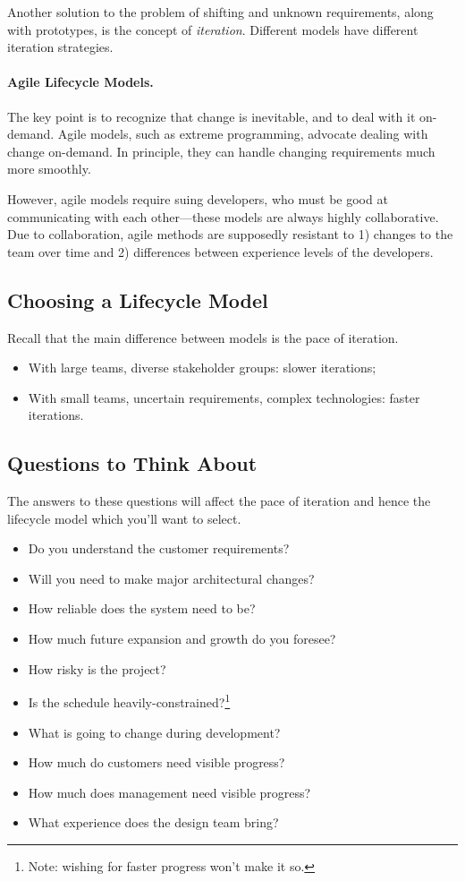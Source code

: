 Another solution to the problem of shifting and unknown requirements,
along with prototypes, is the concept of \emph{iteration}. Different
models have different iteration strategies.

\paragraph{Agile Lifecycle Models.} The key point is to recognize
that change is inevitable, and to deal with it on-demand. Agile
models, such as extreme programming, advocate dealing with change
on-demand. In principle, they can handle changing requirements much
more smoothly.

However, agile models require suing developers, who must be good at
communicating with each other---these models are always highly
collaborative. Due to collaboration, agile methods are
supposedly resistant to 1) changes to the team over time and
2) differences between experience levels of the developers.

\subsection*{Choosing a Lifecycle Model}
Recall that the main difference between models is the pace of iteration.
\begin{itemize}
\item With large teams, diverse stakeholder groups: slower iterations;
\item With small teams, uncertain requirements, complex technologies: faster iterations.
\end{itemize}

\subsection*{Questions to Think About}
The answers to these questions will affect the pace of iteration and
hence the lifecycle model which you'll want to select.\\[-2em]
\begin{itemize}
\item Do you understand the customer requirements?
\item Will you need to make major architectural changes?
\item How reliable does the system need to be?
\item How much future expansion and growth do you foresee?
\item How risky is the project?
\item Is the schedule heavily-constrained?\footnote{Note: wishing for faster progress won't make it so.}
\item What is going to change during development?
\item How much do customers need visible progress?
\item How much does management need visible progress?
\item What experience does the design team bring?
\end{itemize}

